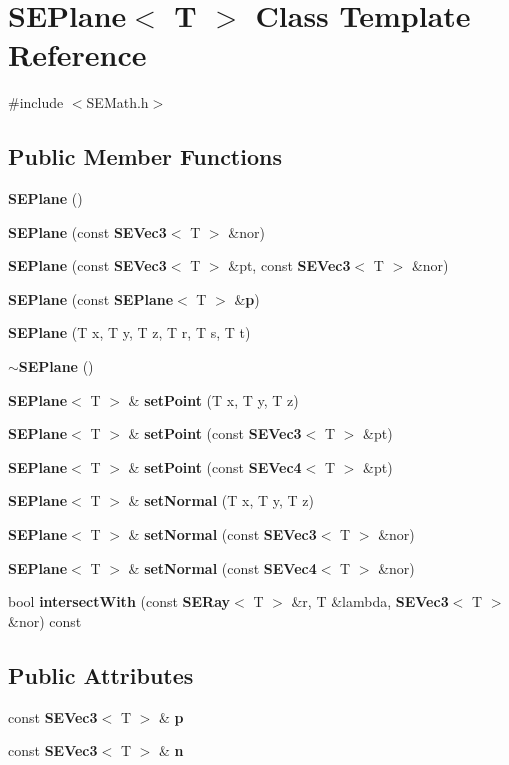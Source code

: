 \section{S\+E\+Plane$<$ T $>$ Class Template Reference}
\label{class_s_e_plane}


{\ttfamily \#include $<$S\+E\+Math.\+h$>$}

\subsection*{Public Member Functions}
\begin{DoxyCompactItemize}
\item 
{\bf S\+E\+Plane} ()
\item 
{\bf S\+E\+Plane} (const {\bf S\+E\+Vec3}$<$ T $>$ \&nor)
\item 
{\bf S\+E\+Plane} (const {\bf S\+E\+Vec3}$<$ T $>$ \&pt, const {\bf S\+E\+Vec3}$<$ T $>$ \&nor)
\item 
{\bf S\+E\+Plane} (const {\bf S\+E\+Plane}$<$ T $>$ \&{\bf p})
\item 
{\bf S\+E\+Plane} (T x, T y, T z, T r, T s, T t)
\item 
{\bf $\sim$\+S\+E\+Plane} ()
\item 
{\bf S\+E\+Plane}$<$ T $>$ \& {\bf set\+Point} (T x, T y, T z)
\item 
{\bf S\+E\+Plane}$<$ T $>$ \& {\bf set\+Point} (const {\bf S\+E\+Vec3}$<$ T $>$ \&pt)
\item 
{\bf S\+E\+Plane}$<$ T $>$ \& {\bf set\+Point} (const {\bf S\+E\+Vec4}$<$ T $>$ \&pt)
\item 
{\bf S\+E\+Plane}$<$ T $>$ \& {\bf set\+Normal} (T x, T y, T z)
\item 
{\bf S\+E\+Plane}$<$ T $>$ \& {\bf set\+Normal} (const {\bf S\+E\+Vec3}$<$ T $>$ \&nor)
\item 
{\bf S\+E\+Plane}$<$ T $>$ \& {\bf set\+Normal} (const {\bf S\+E\+Vec4}$<$ T $>$ \&nor)
\item 
bool {\bf intersect\+With} (const {\bf S\+E\+Ray}$<$ T $>$ \&r, T \&lambda, {\bf S\+E\+Vec3}$<$ T $>$ \&nor) const 
\end{DoxyCompactItemize}
\subsection*{Public Attributes}
\begin{DoxyCompactItemize}
\item 
const {\bf S\+E\+Vec3}$<$ T $>$ \& {\bf p}
\item 
const {\bf S\+E\+Vec3}$<$ T $>$ \& {\bf n}
\end{DoxyCompactItemize}


